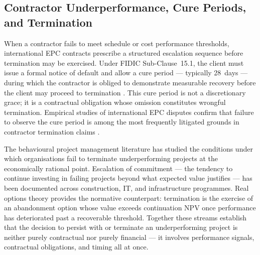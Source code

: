\subsection{Contractor Underperformance, Cure Periods, and Termination}
\label{subsec:lr_interventions}

When a contractor fails to meet schedule or cost performance thresholds,
international EPC contracts prescribe a structured escalation sequence before
termination may be exercised. Under FIDIC Sub-Clause~15.1, the client must
issue a formal notice of default and allow a cure period --- typically 28~days
--- during which the contractor is obliged to demonstrate measurable recovery
before the client may proceed to termination \citep{FIDIC2017, Ndekugri2008}.
This cure period is not a discretionary grace; it is a contractual obligation
whose omission constitutes wrongful termination. Empirical studies of
international EPC disputes confirm that failure to observe the cure period is
among the most frequently litigated grounds in contractor termination claims
\citep{Ndekugri2008, Ennis2021}.

The behavioural project management literature has studied the conditions under
which organisations fail to terminate underperforming projects at the
economically rational point. Escalation of commitment \citep{Staw1987} ---
the tendency to continue investing in failing projects beyond what expected
value justifies --- has been documented across construction, IT, and
infrastructure programmes. Real options theory \citep{Dixit1994,
Huchzermeier2001} provides the normative counterpart: termination is the
exercise of an abandonment option whose value exceeds continuation NPV once
performance has deteriorated past a recoverable threshold. Together these
streams establish that the decision to persist with or terminate an
underperforming project is neither purely contractual nor purely financial ---
it involves performance signals, contractual obligations, and timing all at
once.

